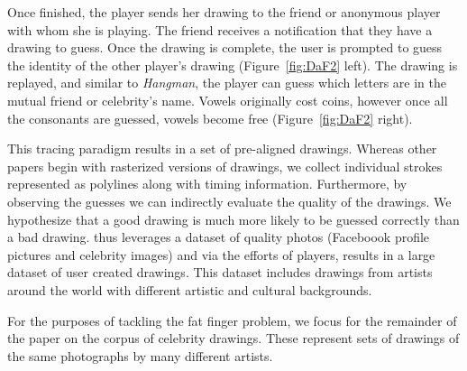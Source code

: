 Once finished, the player sends her drawing to the friend or anonymous player with whom she is playing. The friend receives a notification that they have a drawing to guess. Once the drawing is complete, the user is prompted to guess the identity of the other player's drawing (Figure~\ref{fig:DaF2} left). The drawing is replayed, and similar to {\em Hangman}, the player can guess which letters are in the mutual friend or celebrity's name. Vowels originally cost coins, however once all the consonants are guessed, vowels become free (Figure~\ref{fig:DaF2} right).

This tracing paradigm results in a set of pre-aligned drawings. Whereas other papers begin with rasterized versions of drawings, we collect individual strokes represented as polylines along with timing information.  Furthermore, by observing the guesses we can indirectly evaluate the quality of the drawings. We hypothesize that a good drawing is much more likely to be guessed correctly than a bad drawing. \daf thus leverages a dataset of quality photos (Faceboook profile pictures and celebrity images) and via the efforts of players, results in a large dataset of user created drawings. This dataset includes drawings from artists around the world with different artistic and cultural backgrounds.

For the purposes of tackling the fat finger problem, we focus for the remainder of the paper on the corpus of celebrity drawings. These represent sets of drawings of the same photographs by many different artists.
